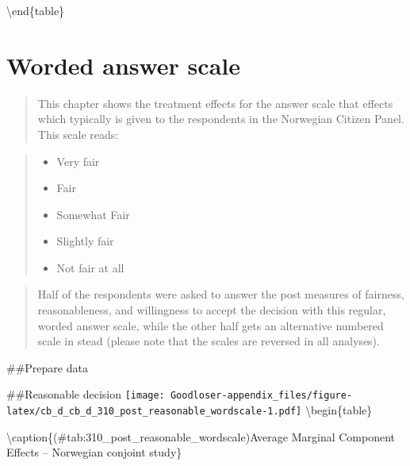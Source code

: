 \documentclass[
]{book}
\providecommand{\tightlist}{%
  \setlength{\itemsep}{0pt}\setlength{\parskip}{0pt}}
\begin{document}
\textbackslash end\{table\}

\hypertarget{worded-answer-scale}{%
\chapter{Worded answer scale}\label{worded-answer-scale}}

\begin{quote}
This chapter shows the treatment effects for the answer scale that effects which typically is given to the respondents in the Norwegian Citizen Panel. This scale reads:
\end{quote}

\begin{quote}
\begin{itemize}
\tightlist
\item
  Very fair\\
\item
  Fair\\
\item
  Somewhat Fair\\
\item
  Slightly fair\\
\item
  Not fair at all
\end{itemize}
\end{quote}

\begin{quote}
Half of the respondents were asked to answer the post measures of fairness, reasonableness, and willingness to accept the decision with this regular, worded answer scale, while the other half gets an alternative numbered scale in stead (please note that the scales are reversed in all analyses).
\end{quote}

\#\#Prepare data

\#\#Reasonable decision
\texttt{[image: Goodloser-appendix\_files/figure-latex/cb\_d\_cb\_d\_310\_post\_reasonable\_wordscale-1.pdf]} \textbackslash begin\{table\}

\textbackslash caption\{(\#tab:310\_post\_reasonable\_wordscale)Average Marginal Component Effects -- Norwegian conjoint study\}
\centering
\end{document}
